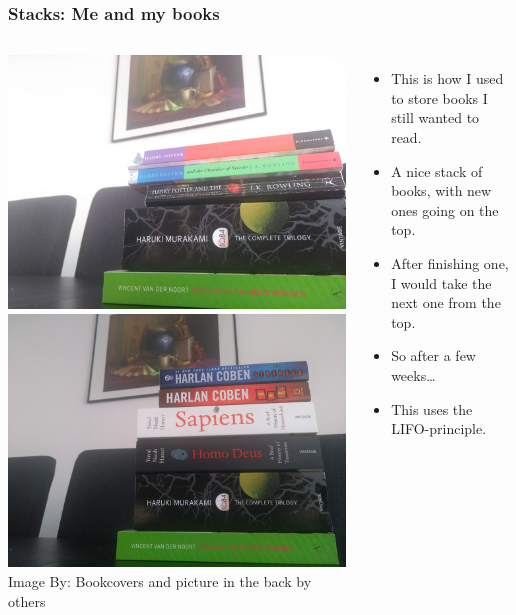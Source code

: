 \begin{frame}
	\frametitle{Stacks: Me and my books}

	\begin{columns}[T]
			\begin{center}

					\includegraphics[width=0.7\linewidth]{images/stack_read.jpg}\\

					\includegraphics[width=0.7\linewidth]{images/stack_unread.jpg}\\

{\scriptsize Image By:}
{\scriptsize Bookcovers and picture in the back by others}
			\end{center}
		\begin{itemize}
			\item This is how I used to store books I still wanted to read.
			\item A nice \alert{stack} of books, with new ones going on the top.
			\item After finishing one, I would take the next one from the top.
			\item So after a few weeks\dots
			\item This uses the \alert{LIFO}-principle.
		\end{itemize}
	\end{columns}
\end{frame}

